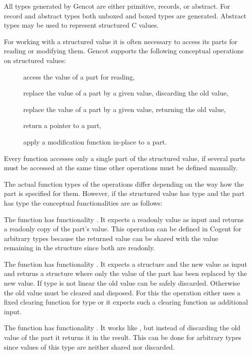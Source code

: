 All types generated by Gencot are either primitive, records, or abstract. For record and abstract types both 
unboxed and boxed types are generated. Abstract types may be used to represent structured C values.

For working with a structured value it is often necessary to access its parts for reading or modifying them.
Gencot supports the following conceptual operations on structured values:
\begin{description}
  \item[] access the value of a part for reading,
  \item[] replace the value of a part by a given value, discarding the old value,
  \item[] replace the value of a part by a given value, returning the old value,
  \item[] return a pointer to a part,
  \item[] apply a modification function in-place to a part.
\end{description}

Every function accesses only a single part of the structured value, if several parts must be accessed at the same
time other operations must be defined manually.

The actual function types of the operations differ depending on the way how the part is specified for them.
However, if the structured value has type  and the part has type  the conceptual functionalities 
are as follows:

The function  has functionality . It expects a readonly value as input and returns
a readonly copy of the part's value. This operation can be defined in Cogent for arbitrary types 
because the returned value can be shared with the value remaining in the structure since both are readonly.

The function  has functionality . It expects a structure and the new value as input
and returns a structure where only the value of the part has been replaced by the new value. If type 
is not linear the old value can be safely discarded. Otherwise the old value must be cleared and disposed.
For this the operation either uses a fixed clearing function for type  or it expects such a clearing
function as additional input.

The function  has functionality . It works like , but instead of
discarding the old value of the part it returns it in the result. This can be done for arbitrary types 
since values of this type are neither shared nor discarded.

